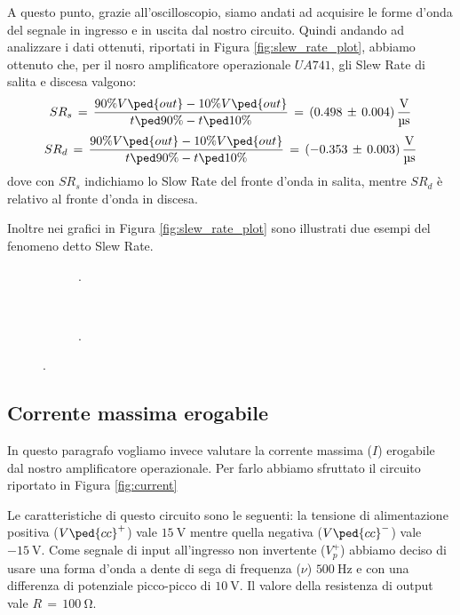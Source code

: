 A questo punto, grazie all'oscilloscopio, siamo andati ad acquisire le forme d'onda del segnale in ingresso e in uscita dal nostro circuito. Quindi andando ad analizzare i dati ottenuti, riportati in Figura \ref{fig:slew_rate_plot}, abbiamo ottenuto che, per il nosro amplificatore operazionale $UA741$, gli Slew Rate di salita e discesa  valgono:
\begin{equation}
	SR_s\,=\,\frac{90\%V\ped{out}-10\%V\ped{out}}{t\ped{90\%}-t\ped{10\%}}\,=\,(0.498\,\pm\,0.004)\,\frac{\SI{}{\volt}}{\SI{}{\micro\second}}
	\label{slew_rate_value_s}
\end{equation}
\begin{equation}
	SR_d\,=\,\frac{90\%V\ped{out}-10\%V\ped{out}}{t\ped{90\%}-t\ped{10\%}}\,=\,(-0.353\,\pm\,0.003)\,\frac{\SI{}{\volt}}{\SI{}{\micro\second}}
	\label{slew_rate_value_d}
\end{equation}
dove con $SR_s$ indichiamo lo Slow Rate del fronte d'onda in salita, mentre $SR_d$ è relativo al fronte d'onda in discesa.

Inoltre nei grafici in Figura \ref{fig:slew_rate_plot} sono illustrati due esempi del fenomeno detto Slew Rate.

\begin{figure}[h]
        \centering
        \begin{subfigure}[b]
                \texttt{[image: slew\_graph1.pdf]}
                \caption{.}
        \end{subfigure}
        ~
        \begin{subfigure}[b]
                \texttt{[image: slew\_signal3.pdf]}
                \caption{.}
        \end{subfigure}
        \label{slew_rate_plot}
\end{figure}

\subsection*{Corrente massima erogabile}

In questo paragrafo vogliamo invece valutare la corrente massima ($I$) erogabile dal nostro amplificatore operazionale. Per farlo abbiamo sfruttato il circuito riportato in Figura \ref{fig:current}

Le caratteristiche di questo circuito sono le seguenti: la tensione di alimentazione positiva ($V\ped{cc}^+$) vale $\SI{+15}{\volt}$ mentre quella negativa ($V\ped{cc}^-$) vale $\SI{-15}{\volt}$. Come segnale di input all'ingresso non invertente ($V_p^+$) abbiamo deciso di usare una forma d'onda a dente di sega di frequenza ($\nu$) $\SI{500}{\hertz}$ e con una differenza di potenziale picco-picco di $\SI{10}{\volt}$. Il valore della resistenza di output vale $R\,=\,\SI{100}{\ohm}$.


